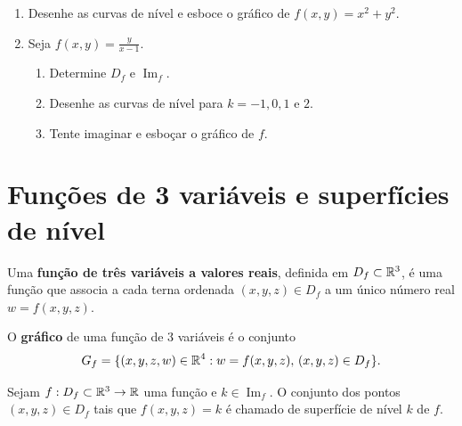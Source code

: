 \begin{exercise}
    \begin{enumerate}
        \item Desenhe as curvas de nível e esboce o gráfico de \(f(x,y) = x^2 + y^2\).
        \item Seja \(f(x,y) = \frac{y}{x-1}\).
            \begin{enumerate}
                \item Determine \(D_f\) e \(\operatorname{Im}_f\).
                \item Desenhe as curvas de nível para \(k = -1,0,1\) e \(2\).
                \item Tente imaginar e esboçar o gráfico de \(f\).
            \end{enumerate}
    \end{enumerate}
\end{exercise}

\section{Funções de 3 variáveis e superfícies de nível}

\begin{definition}
    Uma \textbf{função de três variáveis a valores reais}, definida em \(D_f \subset\mathbb{R}^3\), é uma função que associa a cada terna ordenada \((x,y,z)\in D_f\) a um único número real \(w = f(x,y,z)\).
\end{definition}

\begin{definition}
    O \textbf{gráfico} de uma função de 3 variáveis é o conjunto \[G_f = \{(x,y,z,w)\in\mathbb{R}^4 : w = f(x,y,z),\, (x,y,z)\in D_f\}.\]
\end{definition}


\begin{definition}
    Sejam \(f:D_f\subset\mathbb{R}^3 \to \mathbb{R}\) uma função e \(k\in\operatorname{Im}_f\). O conjunto dos pontos \((x,y,z)\in D_f\) tais que \(f(x,y,z) = k\) é chamado de superfície de nível \(k\) de \(f\).
\end{definition}

